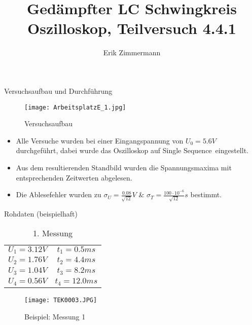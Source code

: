 \documentclass[11pt]{beamer}
\author{Erik Zimmermann}
\title{Gedämpfter LC Schwingkreis Oszilloskop, Teilversuch 4.4.1}
\begin{document}
\begin{frame}
\titlepage
\end{frame}


\begin{frame}{Versuchsaufbau und Durchführung}
\begin{figure}[H]
\centering
\texttt{[image: ArbeitsplatzE\_1.jpg]}
\caption{Versuchsaufbau}
\end{figure}
\end{frame}

\begin{frame}
\begin{itemize}
\item Alle Versuche wurden bei einer Eingangspannung von $U_0=5.6V$ durchgeführt, dabei wurde das Oszilloskop auf \glqq Single Sequence\grqq $\,$ eingestellt.
\item Aus dem resultierenden Standbild wurden die Spannungsmaxima mit entsprechenden Zeitwerten abgelesen.
\item Die Ablesefehler wurden zu $\sigma_U=\frac{0.08}{\sqrt{12}}V$ \& $\sigma_T=\frac{100\cdot 10^{-6}}{\sqrt{12}}s$ bestimmt.
\end{itemize}
\end{frame}

\begin{frame}{Rohdaten (beispielhaft)}
\begin{table}[H]\centering
\caption{1. Messung}
\begin{tabular}{c|c}
\hline
$U_1=3.12V$& $t_1=0.5ms$\\ 
$U_2=1.76V$& $t_2=4.4ms$\\ 
$U_3=1.04V$& $t_3=8.2ms$ \\
$U_4=0.56V$& $t_4=12.0ms$ \\
\end{tabular} 
\end{table}
\begin{figure}[H]\centering
\texttt{[image: TEK0003.JPG]}
\caption{Beispiel: Messung 1}
\end{figure}
\end{frame}
\end{document}
